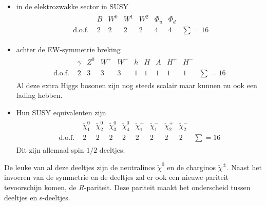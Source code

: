 \documentclass[../main.tex]{subfiles}
\begin{document}
\begin{itemize}
    \item in de elektrozwakke sector in SUSY
        \begin{equation}
            \begin{aligned}
                \label{eq:susy_deeltjes_5}
                \begin{array}{llcccccc} 
                    & B & W^{0} & W^{1} & W^{2} & \Phi_{u} & \Phi_{d} & \\
                    \text { d.o.f. } & 2 & 2 & 2 & 2 & 4 & 4 & \sum=16
                \end{array}
            \end{aligned}
        \end{equation}
    \item achter de EW-symmetrie breking
        \begin{equation}
            \begin{aligned}
                \label{eq:susy_deeltjes_6}
                \begin{array}{lllclllllll} 
                    & \gamma & Z^{0} & W^{+} & W^{-} & h & H & A & H^{+} & H^{-} & \\
                    \text {d.o.f. } & 2 & 3 & 3 & 3 & 1 & 1 & 1 & 1 & 1 & \sum=16
                \end{array}
            \end{aligned}
        \end{equation}
        Al deze extra Higgs bosonen zijn nog steeds scalair maar kunnen nu ook een lading hebben.
    \item Hun SUSY equivalenten zijn
        \begin{equation}
            \begin{aligned}
                \label{eq:susy_deeltjes_7}
                \begin{array}{lccccccccc} 
                    & \tilde{\chi}_{1}^{0} & \tilde{\chi}_{2}^{0} & \tilde{\chi}_{3}^{0} & \tilde{\chi}_{4}^{0} & \tilde{\chi}_{1}^{+} & \tilde{\chi}_{1}^{-} & \tilde{\chi}_{2}^{+} & \tilde{\chi}_{2}^{-} & \\
                    \text {d.o.f. } & 2 & 2 & 2 & 2 & 2 & 2 & 2 & 2 & \sum=16
                \end{array}
            \end{aligned}
        \end{equation}
        Dit zijn allemaal spin $1/2$ deeltjes.
\end{itemize}
De leuke van al deze deeltjes zijn de neutralinos $\tilde{\chi}^{0}$ en de charginos $\tilde{\chi}^{\pm}$. Naast het invoeren van de symmetrie en de deeltjes zal er ook een nieuwe pariteit tevoorschijn komen, de $R$-pariteit. Deze pariteit maakt het onderscheid tussen deeltjes en s-deeltjes.
\end{document}
